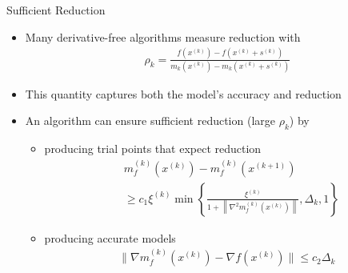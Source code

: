 \documentclass{beamer}
\begin{document}
\begin{frame}{Sufficient Reduction}
	\setlength\itemsep{2em}
	\begin{itemize}
		\item Many derivative-free algorithms measure reduction with
\begin{align*}
	\rho_k = \frac{f\left(x^{(k)}\right) - f\left(x^{(k)}+s^{(k)}\right)}
		{m_k\left(x^{(k)}\right) - m_k\left(x^{(k)}+s^{(k)}\right)}
\end{align*}
\color{red}
		\item This quantity captures both the model's accuracy and reduction
\color{black}
		\item An algorithm can ensure sufficient reduction (large $\rho_k$) by
		\begin{itemize}
			\item producing trial points that expect reduction
\begin{align*}
	& m_f^{(k)}\left(x^{(k)}\right) - m_f^{(k)}\left(x^{(k+1)}\right) \\
	& \ge c_1 \xi^{(k)} \min \left\{
		\frac{\xi^{(k)}}{1 + \left\|\nabla^2 m_f^{(k)}\left(x^{(k)}\right)\right\|},
		\Delta_k, 1\right\}
\end{align*}
			\item producing accurate models
\begin{align*}
		\|\nabla m_f^{(k)}\left(x^{(k)}\right) - \nabla f\left(x^{(k)}\right)\| \le c_2 \Delta_k
\end{align*}
		\end{itemize}
% 		
	\end{itemize}
\end{frame}
\end{document}
